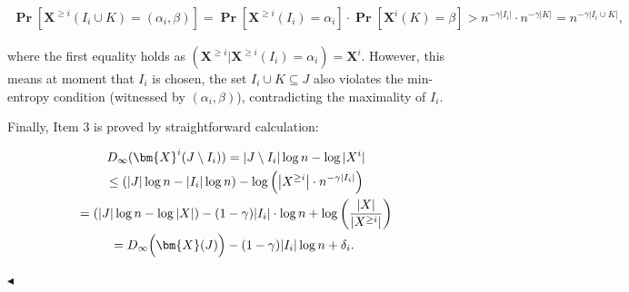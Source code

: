 \documentclass[10pt,a4paper]{article}
\begin{document}
\[\begin{gathered}
\operatorname*{\mathbf{Pr}}\left[\bm{X}^{\geq i}(I_{i}\cup K)=(\alpha_{i},\beta)\right]=\operatorname*{\mathbf{Pr}}\left[\bm{X}^{\geq i}(I_{i})=\alpha_{i}\right]\cdot\operatorname*{\mathbf{Pr}}\left[\bm{X}^{i}(K)=\beta\right]>n^{-\gamma|I_{i}|}\cdot n^{-\gamma|K|}=n^{-\gamma|I_{i}\cup K|},
\end{gathered}\]


where the first equality holds as $(\bm{X}^{\geq i}|\bm{X}^{\geq i}(I_{i})=\alpha_{i})=\bm{X}^{i}$.
However, this means at moment that $I_{i}$ is chosen,
the set $I_{i}\cup K\subseteq J$ also violates the min-entropy condition (witnessed by $(\alpha_{i},\beta)$), contradicting the maximality of $I_{i}$.\par




Finally, Item 3 is proved by straightforward calculation:\par


\[\begin{gathered}
\displaystyle D_{\infty}(\bm{X}^{i}(J\setminus I_{i})) \displaystyle=|J\setminus I_{i}|\log n-\log|X^{i}| \\
\displaystyle\leq(|J|\log n-|I_{i}|\log n)-\log\left(\left|X^{\geq i}\right|\cdot n^{-\gamma|I_{i}|}\right) \\
\displaystyle=(|J|\log n-\log|X|)-(1-\gamma)|I_{i}|\cdot\log n+\log\left(\frac{|X|}{\left|X^{\geq i}\right|}\right) \\
\displaystyle=D_{\infty}\Big{(}\bm{X}(J)\Big{)}-(1-\gamma)|I_{i}|\log n+\delta_{i}.\
\end{gathered}\]


$\blacktriangleleft$\par




\par
\end{document}
